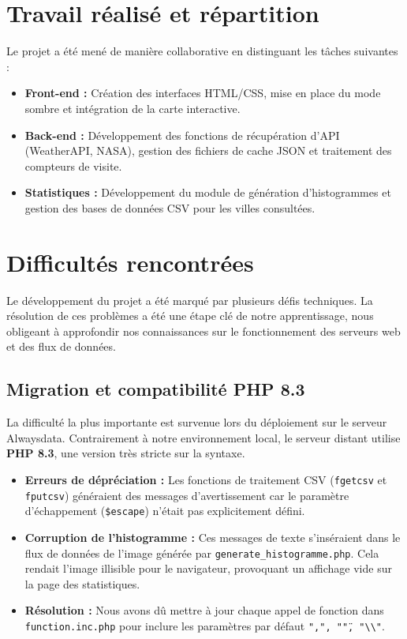 \documentclass[12pt,a4paper]{article}
\begin{document}
\section{Travail réalisé et répartition}
Le projet a été mené de manière collaborative en distinguant les tâches suivantes :
\begin{itemize}
    \item \textbf{Front-end :} Création des interfaces HTML/CSS, mise en place du mode sombre et intégration de la carte interactive.
    \item \textbf{Back-end :} Développement des fonctions de récupération d'API (WeatherAPI, NASA), gestion des fichiers de cache JSON et traitement des compteurs de visite.
    \item \textbf{Statistiques :} Développement du module de génération d'histogrammes et gestion des bases de données CSV pour les villes consultées.
\end{itemize}

\vfill
{} \par
\newpage

\section{Difficultés rencontrées}

Le développement du projet a été marqué par plusieurs défis techniques. La résolution de ces problèmes a été une étape clé de notre apprentissage, nous obligeant à approfondir nos connaissances sur le fonctionnement des serveurs web et des flux de données.

\subsection{Migration et compatibilité PHP 8.3}
La difficulté la plus importante est survenue lors du déploiement sur le serveur Alwaysdata. Contrairement à notre environnement local, le serveur distant utilise \textbf{PHP 8.3}, une version très stricte sur la syntaxe.
\begin{itemize}
    \item \textbf{Erreurs de dépréciation :} Les fonctions de traitement CSV (\texttt{fgetcsv} et \texttt{fputcsv}) généraient des messages d'avertissement car le paramètre d'échappement (\texttt{\$escape}) n'était pas explicitement défini. 
    \item \textbf{Corruption de l'histogramme :} Ces messages de texte s'inséraient dans le flux de données de l'image générée par \texttt{generate\_histogramme.php}. Cela rendait l'image illisible pour le navigateur, provoquant un affichage vide sur la page des statistiques.
    \item \textbf{Résolution :} Nous avons dû mettre à jour chaque appel de fonction dans \texttt{function.inc.php} pour inclure les paramètres par défaut \texttt{",", "\"", "\textbackslash\textbackslash"}.
\end{itemize}
\end{document}
